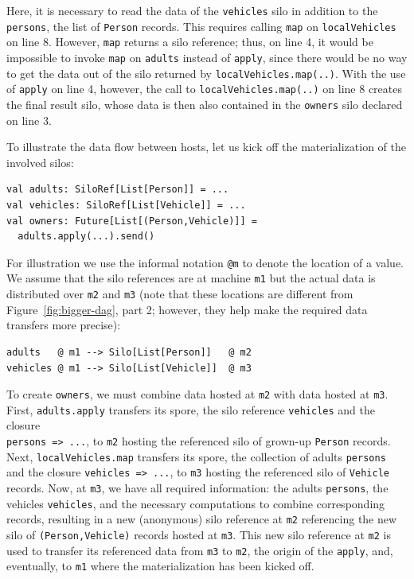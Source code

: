 \documentclass{jfp1}
\begin{document}
\noindent
Here, it is necessary to read the data of the \verb|vehicles| silo in
addition to the \verb|persons|, the list of \verb|Person|
records. This requires calling \verb|map| on \verb|localVehicles| on
line 8.  However, \verb|map| returns a silo reference; thus, on line
4, it would be impossible to invoke \verb|map| on \verb|adults|
instead of \verb|apply|, since there would be no way to get the data
out of the silo returned by \verb|localVehicles.map(..)|. With the use
of \verb|apply| on line 4, however, the call to
\verb|localVehicles.map(..)| on line 8 creates the final result silo,
whose data is then also contained in the \verb|owners| silo declared
on line 3.

To illustrate the data flow between hosts, let us kick off the
materialization of the involved silos:
\begin{lstlisting}
val adults: SiloRef[List[Person]] = ...
val vehicles: SiloRef[List[Vehicle]] = ...
val owners: Future[List[(Person,Vehicle)]] =
  adults.apply(...).send()
\end{lstlisting}
\noindent
For illustration we use the informal notation \verb|@m| to denote the
location of a value. We assume that the silo references are at machine
\verb|m1| but the actual data is distributed over \verb|m2| and
\verb|m3| (note that these locations are different from
Figure~\ref{fig:bigger-dag}, part 2; however, they help make the
required data transfers more precise):

\begin{lstlisting}
adults   @ m1 --> Silo[List[Person]]   @ m2
vehicles @ m1 --> Silo[List[Vehicle]]  @ m3
\end{lstlisting}
\noindent
To create \verb|owners|, we must combine data hosted at \verb|m2| with
data hosted at \verb|m3|. First, \verb|adults.apply| transfers its
spore, \ie the silo reference \verb|vehicles| and the closure\\
\verb|persons => ...|, to \verb|m2| hosting the referenced silo of
grown-up \verb|Person| records. Next, \verb|localVehicles.map|
transfers its spore, \ie the collection of adults \verb|persons| and
the closure \verb|vehicles => ...|, to \verb|m3| hosting the
referenced silo of \verb|Vehicle| records. Now, at \verb|m3|, we have
all required information: the adults \verb|persons|, the vehicles
\verb|vehicles|, and the necessary computations to combine
corresponding records, resulting in a new (anonymous) silo reference
at \verb|m2| referencing the new silo of \verb|(Person,Vehicle)|
records hosted at \verb|m3|. This new silo reference at \verb|m2| is
used to transfer its referenced data from \verb|m3| to \verb|m2|, the
origin of the \verb|apply|, and, eventually, to \verb|m1| where the
materialization has been kicked off.
\end{document}

